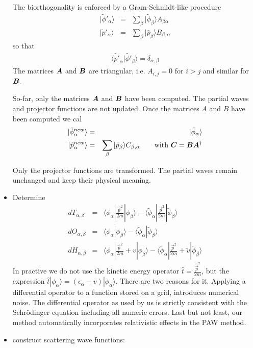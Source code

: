 \documentclass[11pt,a4paper]{report}
\begin{document}
\begin{itemize}
The biorthogonality is enforced by a Gram-Schmidt-like procedure
\begin{eqnarray*}
|\tilde{\phi}'_\alpha\rangle&=&\sum_\beta |\tilde{\phi}_\beta\rangle A_{\beta\alpha}
\\
|\tilde{p}'_\alpha\rangle&=&\sum_\beta |\bar{p}_\beta\rangle B_{\beta,\alpha}
\end{eqnarray*}
so that 
\begin{eqnarray*}
\langle\tilde{p'}_\alpha|\tilde{\phi'}_\beta\rangle=\delta_{\alpha,\beta}
\end{eqnarray*}
The matrices $\bm{A}$ and $\bm{B}$ are triangular, i.e. $A_{i,j}=0$
for $i>j$ and similar for $\bm{B}$.

So-far, only the matrices $\bm{A}$ and $\bm{B}$ have been computed. The partial waves and
projector functions are not updated.  
Once the matrices $A$ and $B$ have been computed we cal
\begin{eqnarray*}
|\tilde{\phi}^{new}_\alpha\rangle&=&|\tilde{\phi}_\alpha\rangle
\\
|\tilde{p}^{new}_\alpha\rangle&=&\sum_\beta |\bar{p}_\beta\rangle C_{\beta,\alpha}
\qquad\text{with $\bm{C}=\bm{B}\bm{A}^{\dagger}$}
\end{eqnarray*}


Only the projector functions are transformed. The partial waves remain
unchanged and keep their physical meaning.

\item Determine 
\begin{eqnarray*}
dT_{\alpha,\beta}&=&
\langle\phi_\alpha|\frac{\vec{p}^2}{2m}|\phi_\beta\rangle
-\langle\tilde{\phi}_\alpha|\frac{\vec{p}^2}{2m}|\tilde{\phi}_\beta\rangle
\\
dO_{\alpha,\beta}&=&
\langle\phi_\alpha|\phi_\beta\rangle
-\langle\tilde{\phi}_\alpha|\tilde{\phi}_\beta\rangle
\\
dH_{\alpha,\beta}&=&
\langle\phi_\alpha|\frac{\vec{p}^2}{2m}+v|\phi_\beta\rangle
-\langle\tilde{\phi}_\alpha|\frac{\vec{p}^2}{2m}+\tilde{v}|\tilde{\phi}_\beta\rangle
\end{eqnarray*}
In practive we do not use the kinetic energy operator
$\hat{t}=\frac{\hat{\vec{p}}^2}{2m}$, but the expression
$\hat{t}|\phi_\alpha
\rangle=(\epsilon_\alpha-v)|\phi_\alpha\rangle$. There are two reasons
for it. Applying a differential operator to a function stored on a
grid, introduces numerical noise. The differential operator as used by
us is strictly consistent with the Schr\"odinger equation including
all numeric errors. Last but not least, our method automatically
incorporates relativistic effects in the PAW method.
\item construct scattering wave functions:


\end{itemize}
\end{document}
